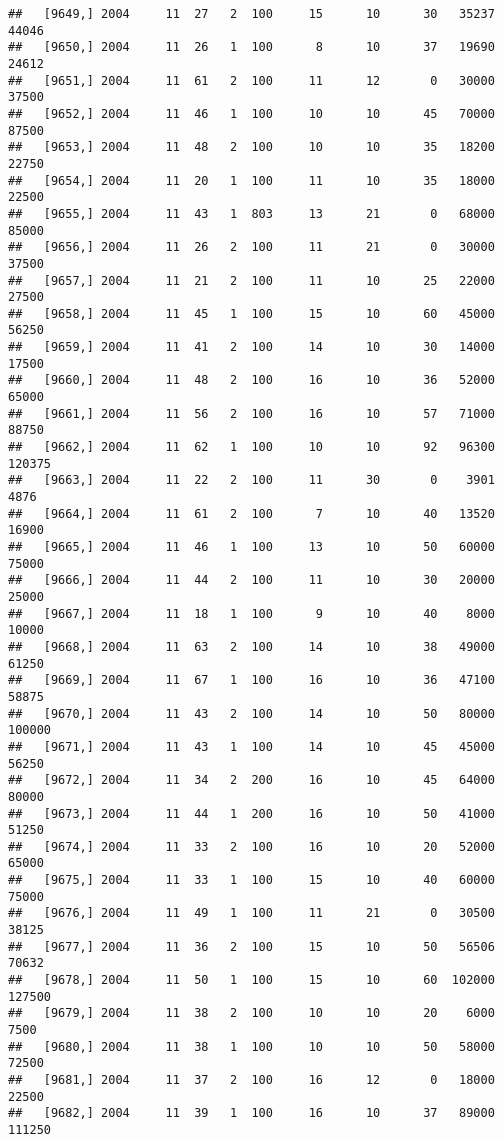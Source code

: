 \documentclass{article}\usepackage[]{graphicx}\usepackage[]{color}
\makeatletter
\newenvironment{kframe}{%
 \def\at@end@of@kframe{}%
 \ifinner\ifhmode%
  \def\at@end@of@kframe{\end{minipage}}%
  \begin{minipage}{\columnwidth}%
 \fi\fi%
 \def\FrameCommand##1{\hskip\@totalleftmargin \hskip-\fboxsep
 \colorbox{shadecolor}{##1}\hskip-\fboxsep
     \hskip-\linewidth \hskip-\@totalleftmargin \hskip\columnwidth}%
 \MakeFramed {\advance\hsize-\width
   \@totalleftmargin\z@ \linewidth\hsize
   \@setminipage}}%
 {\par\unskip\endMakeFramed%
 \at@end@of@kframe}
\newenvironment{knitrout}{}{} %
\makeatother
\begin{document}
\begin{knitrout}
\begin{kframe}
\begin{verbatim}
##   [9649,] 2004     11  27   2  100     15      10      30   35237   44046
##   [9650,] 2004     11  26   1  100      8      10      37   19690   24612
##   [9651,] 2004     11  61   2  100     11      12       0   30000   37500
##   [9652,] 2004     11  46   1  100     10      10      45   70000   87500
##   [9653,] 2004     11  48   2  100     10      10      35   18200   22750
##   [9654,] 2004     11  20   1  100     11      10      35   18000   22500
##   [9655,] 2004     11  43   1  803     13      21       0   68000   85000
##   [9656,] 2004     11  26   2  100     11      21       0   30000   37500
##   [9657,] 2004     11  21   2  100     11      10      25   22000   27500
##   [9658,] 2004     11  45   1  100     15      10      60   45000   56250
##   [9659,] 2004     11  41   2  100     14      10      30   14000   17500
##   [9660,] 2004     11  48   2  100     16      10      36   52000   65000
##   [9661,] 2004     11  56   2  100     16      10      57   71000   88750
##   [9662,] 2004     11  62   1  100     10      10      92   96300  120375
##   [9663,] 2004     11  22   2  100     11      30       0    3901    4876
##   [9664,] 2004     11  61   2  100      7      10      40   13520   16900
##   [9665,] 2004     11  46   1  100     13      10      50   60000   75000
##   [9666,] 2004     11  44   2  100     11      10      30   20000   25000
##   [9667,] 2004     11  18   1  100      9      10      40    8000   10000
##   [9668,] 2004     11  63   2  100     14      10      38   49000   61250
##   [9669,] 2004     11  67   1  100     16      10      36   47100   58875
##   [9670,] 2004     11  43   2  100     14      10      50   80000  100000
##   [9671,] 2004     11  43   1  100     14      10      45   45000   56250
##   [9672,] 2004     11  34   2  200     16      10      45   64000   80000
##   [9673,] 2004     11  44   1  200     16      10      50   41000   51250
##   [9674,] 2004     11  33   2  100     16      10      20   52000   65000
##   [9675,] 2004     11  33   1  100     15      10      40   60000   75000
##   [9676,] 2004     11  49   1  100     11      21       0   30500   38125
##   [9677,] 2004     11  36   2  100     15      10      50   56506   70632
##   [9678,] 2004     11  50   1  100     15      10      60  102000  127500
##   [9679,] 2004     11  38   2  100     10      10      20    6000    7500
##   [9680,] 2004     11  38   1  100     10      10      50   58000   72500
##   [9681,] 2004     11  37   2  100     16      12       0   18000   22500
##   [9682,] 2004     11  39   1  100     16      10      37   89000  111250

\end{verbatim}
\end{kframe}
\end{knitrout}
\end{document}
